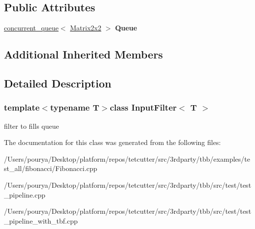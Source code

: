 \subsection*{Public Attributes}
\begin{DoxyCompactItemize}
\item 
\hypertarget{classInputFilter_acd2b8f2e9e8521c07361f255debe2c93}{}\hyperlink{classtbb_1_1concurrent__queue}{concurrent\+\_\+queue}$<$ \hyperlink{structMatrix2x2}{Matrix2x2} $>$ {\bfseries Queue}\label{classInputFilter_acd2b8f2e9e8521c07361f255debe2c93}

\end{DoxyCompactItemize}
\subsection*{Additional Inherited Members}


\subsection{Detailed Description}
\subsubsection*{template$<$typename T$>$class Input\+Filter$<$ T $>$}

filter to fills queue 

The documentation for this class was generated from the following files\+:\begin{DoxyCompactItemize}
\item 
/\+Users/pourya/\+Desktop/platform/repos/tetcutter/src/3rdparty/tbb/examples/test\+\_\+all/fibonacci/Fibonacci.\+cpp\item 
/\+Users/pourya/\+Desktop/platform/repos/tetcutter/src/3rdparty/tbb/src/test/test\+\_\+pipeline.\+cpp\item 
/\+Users/pourya/\+Desktop/platform/repos/tetcutter/src/3rdparty/tbb/src/test/test\+\_\+pipeline\+\_\+with\+\_\+tbf.\+cpp\end{DoxyCompactItemize}
